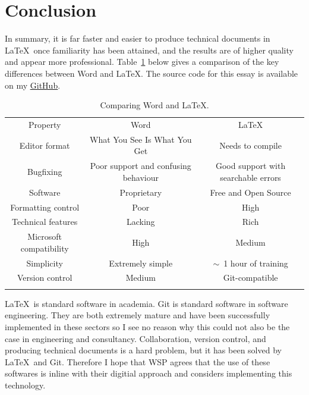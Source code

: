 \section{Conclusion}
\label{sec:Conclusion}

In summary, it is far faster and easier to produce technical documents in \LaTeX\ once familiarity has been attained, and the results are of higher quality and appear more professional. Table~\ref{tab:Comparison} below gives a comparison of the key differences between Word and \LaTeX. The source code for this essay is available on my \href{https://github.com/HenryGinn/Essays/tree/main/TheCaseForLaTeX}{\underline{GitHub}}.

\begin{table}[H]
	\centering
	\caption{Comparing Word and \LaTeX.}
	\label{tab:Comparison}
	\begin{tabular}{ccc}
		\myhline
		Property & Word & \LaTeX  \\
		\myhline
		Editor format & What You See Is What You Get & Needs to compile  \\
		Bugfixing & Poor support and confusing behaviour & Good support with searchable errors  \\
		Software & Proprietary & Free and Open Source  \\
		Formatting control & Poor & High  \\
		Technical features & Lacking & Rich  \\
		Microsoft compatibility & High & Medium  \\
		Simplicity & Extremely simple &  $\sim$~1 hour of training  \\
		Version control & Medium & Git-compatible  \\
		\myhline
	\end{tabular}
\end{table}

\LaTeX\ is standard software in academia. Git is standard software in software engineering. They are both extremely mature and have been successfully implemented in these sectors so I see no reason why this could not also be the case in engineering and consultancy. Collaboration, version control, and producing technical documents is a hard problem, but it has been solved by \LaTeX\ and Git. Therefore I hope that WSP agrees that the use of these softwares is inline with their digitial approach and considers implementing this technology.